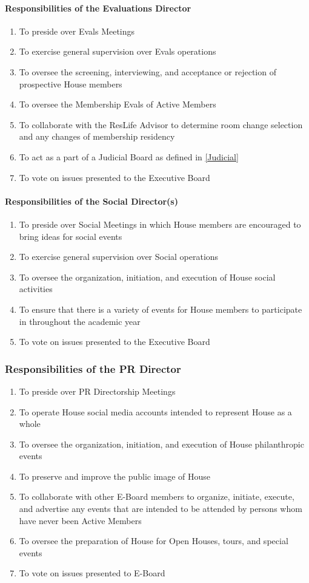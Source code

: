 \documentclass{article}
\newcommand{\asubsection}[1]{\subsubsection{#1} \label{#1}}
\newcommand{\asubsubsection}[1]{\paragraph{#1} \label{#1}}
\begin{document}
\asubsubsection{Responsibilities of the Evaluations Director}
\begin{enumerate}
	\item To preside over Evals Meetings
	\item To exercise general supervision over Evals operations
	\item To oversee the screening, interviewing, and acceptance or rejection of prospective House members
	\item To oversee the Membership Evals of Active Members
	\item To collaborate with the ResLife Advisor to determine room change selection and any changes of membership residency
	\item To act as a part of a Judicial Board as defined in \ref{Judicial}
	\item To vote on issues presented to the Executive Board
\end{enumerate}

\asubsubsection{Responsibilities of the Social Director(s)}
\begin{enumerate}
	\item To preside over Social Meetings in which House members are encouraged to bring ideas for social events
	\item To exercise general supervision over Social operations
	\item To oversee the organization, initiation, and execution of House social activities
  \item To ensure that there is a variety of events for House members to participate in throughout the academic year
  \item To vote on issues presented to the Executive Board
\end{enumerate}

\asubsection{Responsibilities of the PR Director}
\begin{enumerate}
	\item To preside over PR Directorship Meetings
	\item To operate House social media accounts intended to represent House as a whole
	\item To oversee the organization, initiation, and execution of House philanthropic events
	\item To preserve and improve the public image of House
	\item To collaborate with other E-Board members to organize, initiate, execute, and advertise any events that are intended to be attended by persons whom have never been Active Members
    \item To oversee the preparation of House for Open Houses, tours, and special events
	\item To vote on issues presented to E-Board
\end{enumerate}
\end{document}
